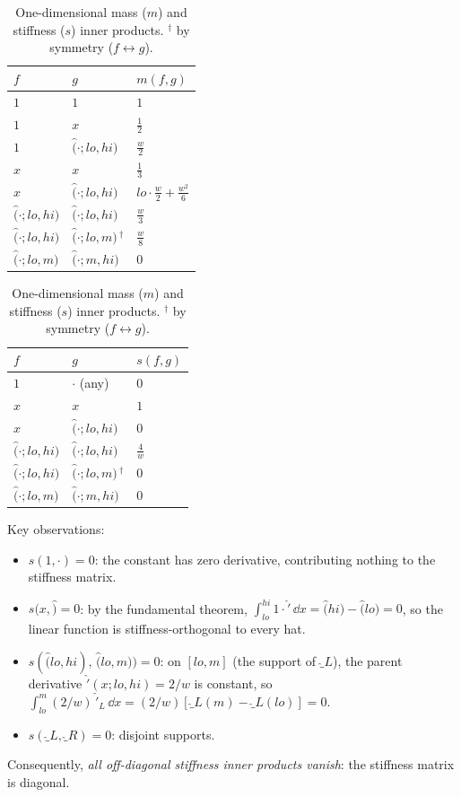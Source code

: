 \documentclass[11pt]{article}
\begin{document}
\begin{table}[h]
\centering
\caption{One-dimensional mass ($m$) and stiffness ($s$) inner products.
${}^\dagger$ by symmetry ($f \leftrightarrow g$).}
\label{tab:1d-inners}
\renewcommand{\arraystretch}{1.35}
\begin{tabular}{ll@{\quad}l}
\toprule
$f$ & $g$ & $m(f,g)$ \\
\midrule
$1$                  & $1$                  & $1$ \\
$1$                  & $x$                  & $\tfrac{1}{2}$ \\
$1$                  & $\hat(\cdot;lo,hi)$  & $\tfrac{w}{2}$ \\
$x$                  & $x$                  & $\tfrac{1}{3}$ \\
$x$                  & $\hat(\cdot;lo,hi)$  & $lo\cdot\tfrac{w}{2} + \tfrac{w^2}{6}$ \\
$\hat(\cdot;lo,hi)$  & $\hat(\cdot;lo,hi)$  & $\tfrac{w}{3}$ \\
$\hat(\cdot;lo,hi)$  & $\hat(\cdot;lo,m)$\,${}^\dagger$
                                             & $\tfrac{w}{8}$ \\
$\hat(\cdot;lo,m)$   & $\hat(\cdot;m,hi)$   & $0$ \\
\bottomrule
\end{tabular}
\qquad
\begin{tabular}{ll@{\quad}l}
\toprule
$f$ & $g$ & $s(f,g)$ \\
\midrule
$1$                  & $\cdot$ (any)         & $0$ \\
$x$                  & $x$                   & $1$ \\
$x$                  & $\hat(\cdot;lo,hi)$   & $0$ \\
$\hat(\cdot;lo,hi)$  & $\hat(\cdot;lo,hi)$   & $\tfrac{4}{w}$ \\
$\hat(\cdot;lo,hi)$  & $\hat(\cdot;lo,m)$\,${}^\dagger$
                                              & $0$ \\
$\hat(\cdot;lo,m)$   & $\hat(\cdot;m,hi)$    & $0$ \\
\bottomrule
\end{tabular}
\end{table}

\noindent
Key observations:
\begin{itemize}
  \item $s(1,\cdot) = 0$: the constant has zero derivative, contributing
        nothing to the stiffness matrix.
  \item $s(x, \hat) = 0$: by the fundamental theorem,
        $\int_{lo}^{hi} 1 \cdot \hat'\,\dd x = \hat(hi) - \hat(lo) = 0$,
        so the linear function is stiffness-orthogonal to every hat.
  \item $s(\hat(lo,hi),\,\hat(lo,m)) = 0$: on $[lo,m]$ (the support of
        $\hat_L$), the parent derivative $\hat'(x;lo,hi) = 2/w$ is constant,
        so $\int_{lo}^m (2/w)\,\hat'_L\,\dd x = (2/w)[\hat_L(m)-\hat_L(lo)]
        = 0$.
  \item $s(\hat_L,\hat_R) = 0$: disjoint supports.
\end{itemize}
Consequently, \emph{all off-diagonal stiffness inner products vanish}: the
stiffness matrix is diagonal.
\end{document}
